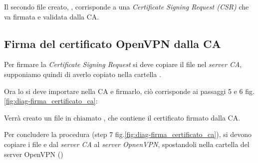 Il secondo file creato, , corrisponde a una \textit{Certificate Signing Request (CSR)} che va firmata e validata dalla CA. 

\subsection{Firma del certificato OpenVPN dalla CA} %
\label{sec:sign_openvpn}

Per firmare la \textit{Certificate Signing Request} si deve copiare il file  nel \textit{server CA}, supponiamo quindi di averlo copiato nella cartella .

Ora lo si deve importare nella CA e firmarlo, ciò corrisponde ai passaggi 5 e 6 fig.\ref{fig:diag-firma_certificato_ca}:


Verrà creato un file in  chiamato , che contiene il certificato firmato dalla CA.

Per concludere la procedura (step 7 fig.\ref{fig:diag-firma_certificato_ca}), si devono copiare i file  e  dal \textit{server CA} al \textit{server OpnenVPN}, spostandoli nella cartella del server OpenVPN ()

